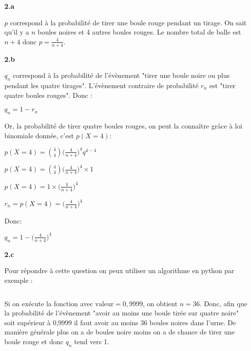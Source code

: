 \documentclass{article}
\newcommand{\vspacem}{\vspace{2mm}}
\newcommand{\bfrac}[2]{\displaystyle\frac{#1}{#2}}
\begin{document}
\vspacem
\textbf{2.a}
\vspacem

\noindent $p$ correspond à la probabilité de tirer une boule rouge pendant un tirage. On sait qu'il y a $n$ boules noires et 4 autres boules rouges. Le nombre total de balle est $n+4$ donc $p = \bfrac{4}{n+4}$.

\vspacem
\textbf{2.b}
\vspacem

\noindent $q_n$ correspond à la probabilité de l'évènement "tirer une boule noire ou plus pendant les quatre tirages". L'évènement contraire de probabilité $r_n$ est "tirer quatre boules rouges". Donc :

$q_n = 1 - r_n$

\noindent Or, la probabilité de tirer quatre boules rouges, on peut la connaître grâce à loi binomiale donnée, c'est $p(X = 4)$:

$p(X = 4) = \displaystyle{4 \choose 4}\bigg(\bfrac{4}{n+4}\bigg)^4 q^{4-4}$

$p(X = 4) = \displaystyle{4 \choose 4}\bigg(\bfrac{4}{n+4}\bigg)^4 \times 1$

$p(X = 4) = 1 \times \bigg(\bfrac{4}{n+4}\bigg)^4$

$r_n = p(X = 4) = \bigg(\bfrac{4}{n+4}\bigg)^4$

\noindent Donc:

$q_n = 1 - \bigg(\bfrac{4}{n+4}\bigg)^4$

\newpage
\vspacem
\textbf{2.c}
\vspacem

\noindent Pour répondre à cette question on peux utiliser un algorithme en python par exemple :

\inputminted{python}{DM_18_python.py}

\noindent Si on exécute la fonction avec $\text{valeur} = 0,9999$, on obtient $n = 36$. Donc, afin que la probabilité de l'évènement "avoir au moins une boule tirée sur quatre noire" soit supérieur à 0,9999 il faut avoir au moins 36 boules noires dans l'urne. De manière générale plus on a de boules noire moins on a de chance de tirer une boule rouge et donc $q_n$ tend vers 1.
\end{document}
